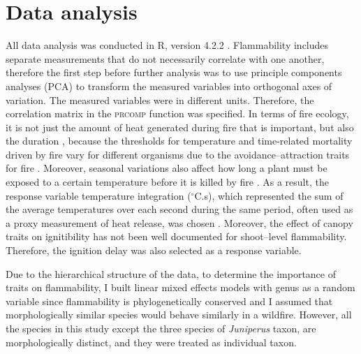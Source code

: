 \documentclass{ttuthes2007}
\newcommand{\pkg}[1]{\textsc{#1}}
\begin{document}
\section{Data analysis}

All data analysis was conducted in R, version 4.2.2 \citep{R}. 
Flammability includes separate measurements that do not necessarily correlate with one another, therefore the first step before further analysis was to use principle components analyses (PCA) to transform the measured variables into orthogonal axes of variation. The measured variables were in different units. Therefore, the correlation matrix in the \pkg{prcomp} function was specified. In terms of fire ecology, it is not just the amount of heat generated during fire that is important, but also the duration \citep{mcgranahan2020inconvenient}, because the thresholds for temperature and time-related mortality driven by fire vary for different organisms \citep{nelson1952observations,vines1968heat, bond1983dead, hengst1994bark,pinard1997fire,lawes2011bark, pingree2019myth} due to the avoidance–attraction traits for fire \citep{schwilk2001flammability, archibald2019unified}. Moreover, seasonal variations also affect how long a plant must be exposed to a certain temperature before it is killed by fire \citep{wright1970method}. As a result, the response variable temperature integration ($^{\circ}$C.s), which represented the sum of the average temperatures over each second during the same period, often used as a proxy measurement of heat release, was chosen \citep{gao2018grass, mcgranahan2020inconvenient}. Moreover, the effect of canopy traits on ignitibility has not been well documented for shoot--level flammability. Therefore, the ignition delay was also selected as a response variable.

Due to the hierarchical structure of the data, to determine the importance of traits on flammability, I built linear mixed effects models with genus as a random variable since flammability is phylogenetically conserved \citep{cui2020shoot} and I assumed that morphologically similar species would behave similarly in a wildfire. However, all the species in this study except the three species of \emph{Juniperus} taxon,
are morphologically distinct, and they were treated as individual taxon. 
\end{document}
